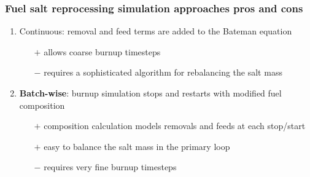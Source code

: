 \begin{frame}
\frametitle{Fuel salt reprocessing simulation approaches pros and cons}

\begin{enumerate}
	\itemsep2em
	\item Continuous: removal and feed terms are added to the Bateman equation
	\begin{itemize}
		\itemsep1em
		\item[$\mathbf{+}$] allows coarse burnup timesteps
		\item[$\mathbf{-}$] requires a sophisticated algorithm for rebalancing 
		the salt mass 
	\end{itemize}
	\item \textbf{Batch-wise}: burnup simulation stops and restarts with 
	modified fuel composition
	\begin{itemize}
		\itemsep1em
		\item[$\mathbf{+}$] composition calculation models removals and feeds 
		at each stop/start
		\item[$\mathbf{+}$] easy to balance the salt mass in the primary loop
		\item[$\mathbf{-}$] requires very fine burnup timesteps
	\end{itemize}
\end{enumerate}
\end{frame}


